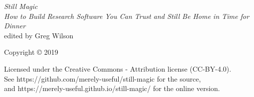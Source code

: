 \documentclass[10pt,letterpaper]{memoir}
\begin{document}
\pagestyle{empty}

{\begingroup
  \raggedleft
  \vspace*{\baselineskip}

  {\Huge\itshape Still Magic}\\[\baselineskip]

  {\large\itshape
    How to Build Research Software You Can Trust and Still Be Home in Time for Dinner
  }\\[0.2\textheight]

  {\large edited by Greg Wilson}\par

  \vfill

  {\large Copyright {\copyright} 2019}

  \vspace*{\baselineskip}


  \vspace*{\baselineskip}

  {\small
    Licensed under the Creative Commons - Attribution license (CC-BY-4.0).
    \\
    See https://github.com/merely-useful/still-magic for the source,\\
    and https://merely-useful.github.io/still-magic/ for the online version.
  }

\endgroup}

\newpage

\pagestyle{empty}

~

\newpage

\tableofcontents

\newpage

\pagestyle{empty}

~

\newpage

\pagestyle{plain}


\end{document}
